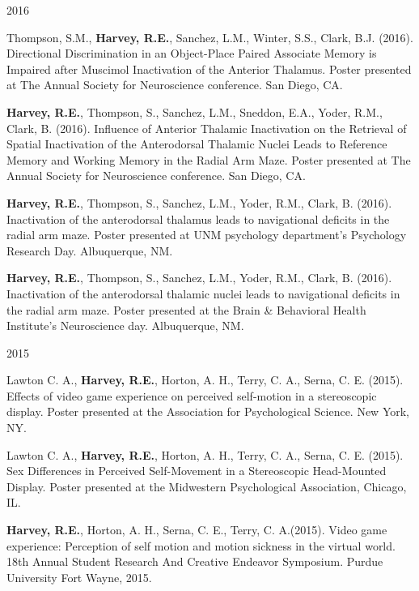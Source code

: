 \begin{cventries}
\cventry
    {} %
    {} %
    {} %
    {2016} %
    {
      \begin{cvitems} %
      \setlength\itemsep{0.35em}
        \item {Thompson, S.M., \textbf{Harvey, R.E.}, Sanchez, L.M., Winter, S.S., Clark, B.J. (2016). Directional Discrimination in an Object-Place Paired Associate Memory is Impaired after Muscimol Inactivation of the Anterior Thalamus. Poster presented at The Annual Society for Neuroscience conference. San Diego, CA.}
        \item {\textbf{Harvey, R.E.}, Thompson, S., Sanchez, L.M., Sneddon, E.A., Yoder, R.M., Clark, B. (2016). Influence of Anterior Thalamic Inactivation on the Retrieval of Spatial Inactivation of the Anterodorsal Thalamic Nuclei Leads to Reference Memory and Working Memory in the Radial Arm Maze. Poster presented at The Annual Society for Neuroscience conference. San Diego, CA.}
        \item {\textbf{Harvey, R.E.}, Thompson, S., Sanchez, L.M., Yoder, R.M., Clark, B. (2016). Inactivation of the anterodorsal thalamus leads to navigational deficits in the radial arm maze. Poster presented at UNM psychology department’s Psychology Research Day. Albuquerque, NM.}
        \item {\textbf{Harvey, R.E.}, Thompson, S., Sanchez, L.M., Yoder, R.M., Clark, B. (2016). Inactivation of the anterodorsal thalamic nuclei leads to navigational deficits in the radial arm maze. Poster presented at the Brain \& Behavioral Health Institute’s Neuroscience day. Albuquerque, NM.}
      \end{cvitems}
    }
\end{cventries}


\begin{cventries}
\cventry
    {} %
    {} %
    {} %
    {2015} %
    {
      \begin{cvitems} %
      \setlength\itemsep{0.35em}
        \item {Lawton C. A., \textbf{Harvey, R.E.}, Horton, A. H., Terry, C. A., Serna, C. E. (2015). Effects of video game experience on perceived self-motion in a stereoscopic display. Poster presented at the Association for Psychological Science. New York, NY.}
        \item {Lawton C. A., \textbf{Harvey, R.E.}, Horton, A. H., Terry, C. A., Serna, C. E. (2015). Sex Differences in Perceived Self-Movement in a Stereoscopic Head-Mounted Display. Poster presented at the Midwestern Psychological Association, Chicago, IL.}
        \item {\textbf{Harvey, R.E.}, Horton, A. H., Serna, C. E., Terry, C. A.(2015). Video game experience: Perception of self motion and motion sickness in the virtual world. 18th Annual Student Research And Creative Endeavor Symposium. Purdue University Fort Wayne, 2015.}
      \end{cvitems}
    }
\end{cventries}


